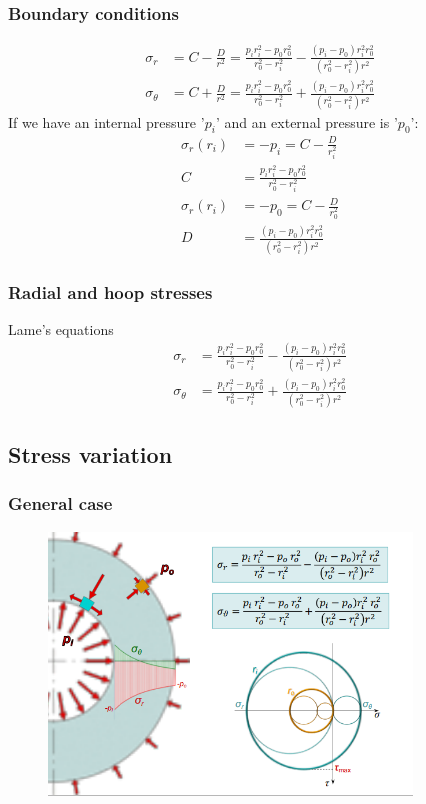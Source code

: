 \documentclass[class=report, crop=false, 12pt,a4paper]{standalone}
\begin{document}
\subsubsection{Boundary conditions}
\begin{align}
    \sigma_r &= C - \frac{D}{r^2} = \frac{p_i r_i^2 - p_0r_0^2}{r_0^2 - r_i^2} - \frac{\left(p_i-p_0\right)r_i^2r_0^2}{\left(r_0^2-r_i^2\right)r^2}\\
    \sigma_{\theta} &= C + \frac{D}{r^2} = \frac{p_i r_i^2 - p_0r_0^2}{r_0^2 - r_i^2} + \frac{\left(p_i-p_0\right)r_i^2r_0^2}{\left(r_0^2-r_i^2\right)r^2}
\end{align}
If we have an internal pressure '$p_i$' and an external pressure is '$p_0$':
\begin{align}
    \sigma_r\left(r_i\right) &= -p_i = C - \frac{D}{r_i^2}\\
    C &= \frac{p_i r_i^2 - p_0r_0^2}{r_0^2 - r_i^2}\\
    \sigma_r\left(r_i\right) &= -p_0 = C - \frac{D}{r_0^2}\\
    D &= \frac{\left(p_i-p_0\right)r_i^2r_0^2}{\left(r_0^2-r_i^2\right)r^2}
\end{align}
\subsubsection{Radial and hoop stresses}
Lame's equations
\begin{align}
    \sigma_r &= \frac{p_i r_i^2 - p_0r_0^2}{r_0^2 - r_i^2} - \frac{\left(p_i-p_0\right)r_i^2r_0^2}{\left(r_0^2-r_i^2\right)r^2}\\
    \sigma_{\theta} &= \frac{p_i r_i^2 - p_0r_0^2}{r_0^2 - r_i^2} + \frac{\left(p_i-p_0\right)r_i^2r_0^2}{\left(r_0^2-r_i^2\right)r^2}
\end{align}
\subsection{Stress variation}
\subsubsection{General case}
\begin{figure}[H]
    \centering
    \includegraphics[height = 7cm]{../img/diagram113.png}
    \caption{}
\end{figure}
\end{document}
